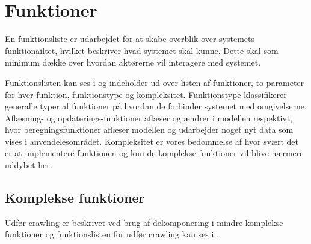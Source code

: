 \section{Funktioner}
\label{sec:funktioner}

En funktionsliste er udarbejdet for at skabe overblik over systemets funktionailtet, hvilket beskriver hvad systemet skal kunne. Dette skal som minimum dække over hvordan aktørerne vil interagere med systemet.

Funktionslisten kan ses i  og indeholder ud over listen af funktioner, to parameter for hver funktion, funktionstype og kompleksitet. Funktionstype klassifikerer generalle typer af funktioner på hvordan de forbinder systemet med omgivelserne. Aflæsning- og opdaterings-funktioner aflæser og ændrer i modellen respektivt, hvor beregningsfunktioner aflæser modellen og udarbejder noget nyt data som vises i anvendelesområdet. Kompleksitet er vores bedømmelse af hvor svært det er at implementere funktionen og kun de komplekse funktioner vil blive nærmere uddybet her.



\subsection{Komplekse funktioner}
Udfør crawling er beskrivet ved brug af dekomponering i mindre komplekse funktioner og funktionslisten for udfør crawling kan ses i .

